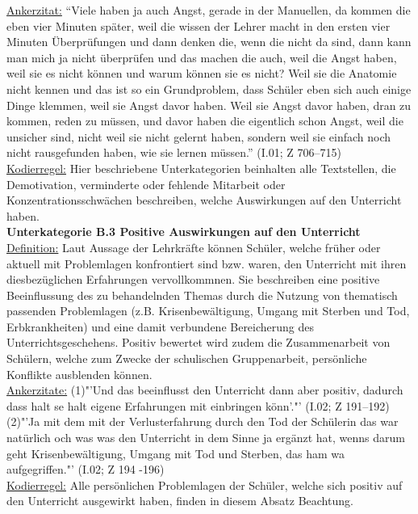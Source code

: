 \underline{Ankerzitat:} "`Viele haben ja auch Angst, gerade in der Manuellen, da kommen die eben vier Minuten später, weil die wissen der Lehrer macht in den ersten vier Minuten Überprüfungen und dann denken die, wenn die nicht da sind, dann kann man mich ja nicht überprüfen und das machen die auch, weil die Angst haben, weil sie es nicht können und warum können sie es nicht? Weil sie die Anatomie nicht kennen und das ist so ein Grundproblem, dass Schüler eben sich auch einige Dinge klemmen, weil sie Angst davor haben. Weil sie Angst davor haben, dran zu kommen, reden zu müssen, und davor haben die eigentlich schon Angst, weil die unsicher sind, nicht weil sie nicht gelernt haben, sondern weil sie einfach noch nicht rausgefunden haben, wie sie lernen müssen."' (I.01; Z 706--715)\\
\underline{Kodierregel:} Hier beschriebene Unterkategorien beinhalten alle Textstellen, die Demotivation, verminderte oder fehlende Mitarbeit oder Konzentrationsschwächen beschreiben, welche Auswirkungen auf den Unterricht haben. \\

\textbf{Unterkategorie B.3 Positive Auswirkungen auf den Unterricht}\\
\underline{Definition:} Laut Aussage der Lehrkräfte können Schüler, welche früher oder aktuell mit Problemlagen konfrontiert sind bzw. waren, den Unterricht mit ihren diesbezüglichen Erfahrungen vervollkommnen. Sie beschreiben eine positive Beeinflussung des zu behandelnden Themas durch die Nutzung von thematisch passenden Problemlagen (z.B. Krisenbewältigung, Umgang mit Sterben und Tod, Erbkrankheiten) und eine damit verbundene Bereicherung des Unterrichtsgeschehens. Positiv bewertet wird zudem die Zusammenarbeit von Schülern, welche zum Zwecke der schulischen Gruppenarbeit, persönliche Konflikte ausblenden können.\\
\underline{Ankerzitate:} (1)"'Und das beeinflusst den Unterricht dann aber positiv, dadurch dass halt se halt eigene Erfahrungen mit einbringen könn'."' (I.02; Z 191--192) (2)"'Ja mit dem mit der Verlusterfahrung durch den Tod der Schülerin das war natürlich och was was den Unterricht in dem Sinne ja ergänzt hat, wenns darum geht Krisenbewältigung, Umgang mit Tod und Sterben, das ham wa aufgegriffen."' (I.02; Z 194 -196)\\
\underline{Kodierregel:} Alle persönlichen Problemlagen der Schüler, welche sich positiv auf den Unterricht ausgewirkt haben, finden in diesem Absatz Beachtung.\\

